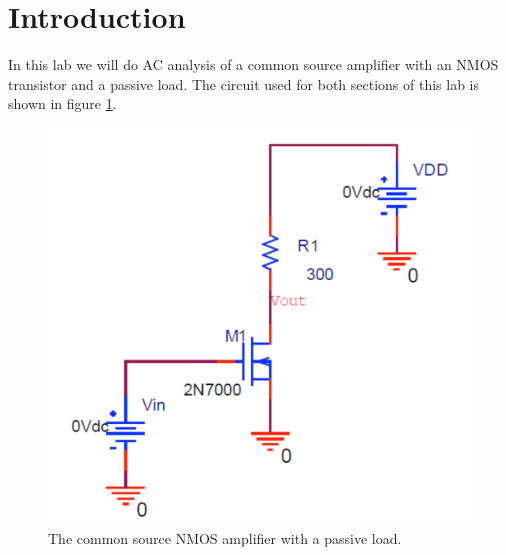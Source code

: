 \section{Introduction}
In this lab we will do AC analysis of a common source amplifier with an NMOS transistor and a passive load.
The circuit used for both sections of this lab is shown in figure \ref{fig:circuit}.

\FloatBarrier

\begin{figure}[h!]
	\centering
		\includegraphics[scale=0.75]{../img/circuit}
			\caption{The common source NMOS amplifier with a passive load.}
			\label{fig:circuit}
			\end{figure}

			\FloatBarrier
